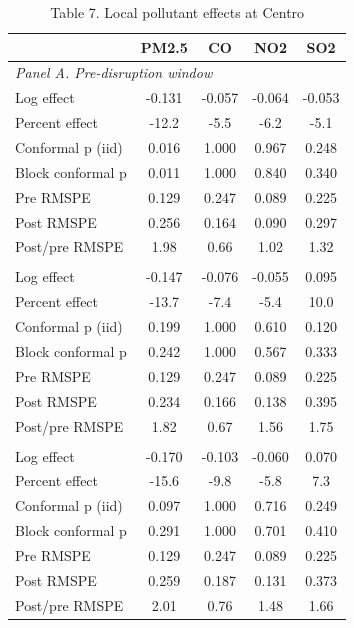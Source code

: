 \begin{table}[htbp]\centering
\begin{threeparttable}
\caption{Table 7. Local pollutant effects at Centro}
\begin{tabular}{lcccc}
\toprule
 & PM2.5 & CO & NO2 & SO2 \\
\midrule
\multicolumn{5}{l}{\textit{Panel A. Pre-disruption window}} \\
Log effect & -0.131 & -0.057 & -0.064 & -0.053 \\
Percent effect & -12.2 & -5.5 & -6.2 & -5.1 \\
Conformal p (iid) & 0.016 & 1.000 & 0.967 & 0.248 \\
Block conformal p & 0.011 & 1.000 & 0.840 & 0.340 \\
Pre RMSPE & 0.129 & 0.247 & 0.089 & 0.225 \\
Post RMSPE & 0.256 & 0.164 & 0.090 & 0.297 \\
Post/pre RMSPE & 1.98 & 0.66 & 1.02 & 1.32 \\
\addlinespace
\multicolumn{5}{l}{\textit{Panel B. Donut window}} \\
Log effect & -0.147 & -0.076 & -0.055 & 0.095 \\
Percent effect & -13.7 & -7.4 & -5.4 & 10.0 \\
Conformal p (iid) & 0.199 & 1.000 & 0.610 & 0.120 \\
Block conformal p & 0.242 & 1.000 & 0.567 & 0.333 \\
Pre RMSPE & 0.129 & 0.247 & 0.089 & 0.225 \\
Post RMSPE & 0.234 & 0.166 & 0.138 & 0.395 \\
Post/pre RMSPE & 1.82 & 0.67 & 1.56 & 1.75 \\
\addlinespace
\multicolumn{5}{l}{\textit{Panel C. Full post-opening window}} \\
Log effect & -0.170 & -0.103 & -0.060 & 0.070 \\
Percent effect & -15.6 & -9.8 & -5.8 & 7.3 \\
Conformal p (iid) & 0.097 & 1.000 & 0.716 & 0.249 \\
Block conformal p & 0.291 & 1.000 & 0.701 & 0.410 \\
Pre RMSPE & 0.129 & 0.247 & 0.089 & 0.225 \\
Post RMSPE & 0.259 & 0.187 & 0.131 & 0.373 \\
Post/pre RMSPE & 2.01 & 0.76 & 1.48 & 1.66 \\
\bottomrule
\end{tabular}
\begin{tablenotes}\footnotesize

\end{tablenotes}
\end{threeparttable}
\end{table}
